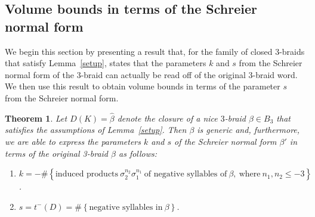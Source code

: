 \documentclass{article}
\newtheorem{theorem}{Theorem}[section]
\newtheorem{corollary}{Corollary}[section]
\begin{document}
%
%
%
  






















\subsection{Volume bounds in terms of the Schreier normal form}

We begin this section by presenting a result that, for the family of closed 3-braids that satisfy Lemma~\ref{setup}, states that the parameters $k$ and $s$ from the Schreier normal form of the 3-braid can actually be read off of the original 3-braid word. We then use this result to obtain volume bounds in terms of the parameter $s$ from the Schreier normal form. 

\begin{theorem}
\label{normformthm}
Let $D(K)=\widehat{\beta}$ denote the closure of a nice $3$-braid $\beta \in B_{3}$ that satisfies the assumptions of Lemma~\ref{setup}. Then $\beta$ is generic and, furthermore, we are able to express the parameters $k$ and $s$ of the Schreier normal form $\beta'$ in terms of the original 3-braid $\beta$ as follows:
\begin{enumerate}
\item[(1)] $k=-\# \left\{\text{induced\ products}\ \sigma_{2}^{n_{2}}\sigma_{1}^{n_{1}}\ \text{of\ negative\ syllables\ of}\ \beta,\ \text{where}\ n_{1}, n_{2} \leq -3 \right\}$.
\item[(2)] $s=t^{-}(D)=\#\left\{\text{negative\ syllables\ in}\ \beta \right\}$.
\end{enumerate}
\end{theorem}
\end{document}
